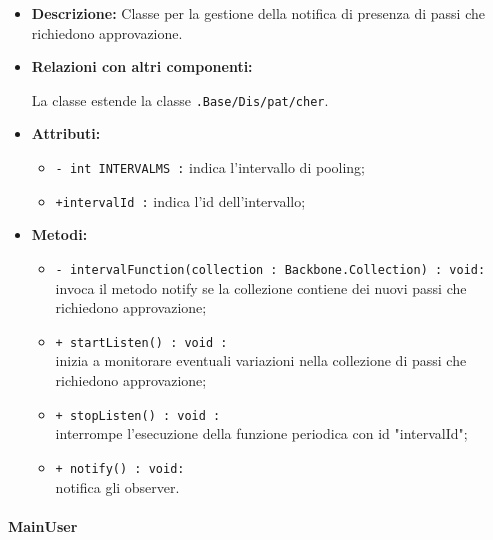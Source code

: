 \begin{flushleft}
\begin{itemize}
\item \textbf{Descrizione:} Classe per la gestione della notifica di presenza di passi che richiedono approvazione.
\item \textbf{Relazioni con altri componenti:}
\begin{sloppypar}
La classe estende la classe \texttt{\logic{}.Base\fshyp{}Dis\fshyp{}pat\fshyp{}cher}.
\end{sloppypar}
\item \textbf{Attributi:}
\begin{sloppypar}
\begin{itemize}
	\item \texttt{- int INTERVALMS :} indica l'intervallo di pooling;
  	\item \texttt{+intervalId :} indica l'id dell'intervallo;
\end{itemize}
\end{sloppypar}
\item \textbf{Metodi:}
\begin{sloppypar}
\begin{itemize}  
	\item \texttt{- intervalFunction(collection : Backbone.Collection) : void:}\\ invoca il metodo notify se la collezione contiene dei nuovi passi che richiedono approvazione;
  	\item \texttt{+ startListen() : void :}\\ inizia a monitorare eventuali variazioni nella collezione di passi che richiedono approvazione;
  	\item \texttt{+ stopListen() : void :}\\ interrompe l'esecuzione della funzione periodica con id "intervalId";
  	\item \texttt{+ notify() : void:}\\ notifica gli observer.
\end{itemize}
\end{sloppypar}
\end{itemize}
\end{flushleft}

\paragraph{MainUser}
\label{mainUser}


